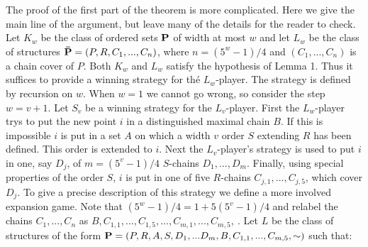 \documentclass[twoside]{article}
\begin{document}
The proof of the first part of the theorem is more complicated.   Here we
give the main line of the argument, but leave many of the details for the
reader to check.    Let $K_w$     be the class of ordered sets $\mathbf{P}$   of width at most $w$
and let   $L_w$   be the class of structures $\mathbf{\bar{P}} = (P,R,C_1,...,C_n)$, where   $n =
(5^w-1)/4$   and  $(C_1,...,C_n)$ is a chain cover of   $P$.    Both   $K_w$     and   $L_w$ satisfy
the hypothesis of Lemma 1.   Thus it suffices to provide a winning strategy for
thé   $L_w$-player.   The strategy is defined by recursion on   $w$.   When   $w=1$   we cannot go wrong, so consider the step $w = v+1$. 
Let $S_v$ be a winning strategy for the $L_v$-player. 
First the $L_w$-player trys to put the new point $i$ in a distinguished maximal chain $B$. 
If this is impossible $i$ is put in a set $A$ on which a width $v$ order $S$ extending $R$ has been defined. 
This order is extended to $i$. 
Next the $L_v$-player's strategy is used to put $i$ in one, say $D_j$, of $m = (5^v-1)/4$ $S$-chains $D_1,...,D_m$. 
Finally, using special properties of the order   $S$, $i$    is put in one of five $R$-chains   $C_{j,1},...,C_{j,5}$, which cover
$D_j$. To give a precise description of this strategy we define a more involved expansion game.    Note that   $(5^w-1)/4 = 1+5(5^v-1)/4$   and relabel the chains
$C_1,...,C_n$ as $B,C_{1,1},...,C_{1,5},...,C_{m,1},...,C_{m,5},~$.    Let   $L$   be the class of
structures of the form   $\mathbf{P} = (P,R,A,S,D_1,... D_m,B,C_{1,1},..., C_{m,5}, \sim)$   such that:\\
\end{document}
